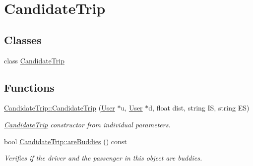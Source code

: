 \hypertarget{group___candidate_trip}{}\section{Candidate\+Trip}
\label{group___candidate_trip}
\subsection*{Classes}
\begin{DoxyCompactItemize}
\item 
class \hyperlink{class_candidate_trip}{Candidate\+Trip}
\end{DoxyCompactItemize}
\subsection*{Functions}
\begin{DoxyCompactItemize}
\item 
\hyperlink{group___candidate_trip_gad9ecdfcf0d01c7d88a92a132a7f3bc67}{Candidate\+Trip\+::\+Candidate\+Trip} (\hyperlink{class_user}{User} $\ast$u, \hyperlink{class_user}{User} $\ast$d, float dist, string IS, string ES)
\begin{DoxyCompactList}\small\item\em \hyperlink{class_candidate_trip}{Candidate\+Trip} constructor from individual parameters. \end{DoxyCompactList}\item 
bool \hyperlink{group___candidate_trip_ga5857725c938706a05eddef0102bf9456}{Candidate\+Trip\+::are\+Buddies} () const
\begin{DoxyCompactList}\small\item\em Verifies if the driver and the passenger in this object are buddies. \end{DoxyCompactList}\end{DoxyCompactItemize}
